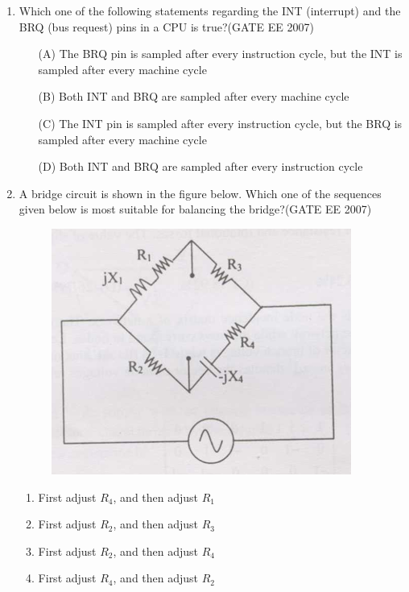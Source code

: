 \documentclass[a4paper,10pt]{exam}
\theoremstyle{remark}
\begin{document}
\begin{enumerate}
\vspace{1em}

\item 
Which one of the following statements regarding the INT (interrupt) and the BRQ (bus request) pins in a CPU is true?\hfill{(GATE EE 2007)}

\begin{enumerate}
    \item[(A)] The BRQ pin is sampled after every instruction cycle, but the INT is sampled after every machine cycle
    \item[(B)] Both INT and BRQ are sampled after every machine cycle
    \item[(C)] The INT pin is sampled after every instruction cycle, but the BRQ is sampled after every machine cycle
    \item[(D)] Both INT and BRQ are sampled after every instruction cycle
\end{enumerate}

\vspace{1em}

\item 
A bridge circuit is shown in the figure below. Which one of the sequences given below is most suitable for balancing the bridge?\hfill{(GATE EE 2007)}

\begin{figure}[H]
    \centering
    \includegraphics[width=0.5\linewidth]{figs/Q 70.png}
\end{figure}

\begin{multicols}{2}
\begin{enumerate}
 \item  First adjust $R_4$, and then adjust $R_1$
\item   First adjust $R_2$, and then adjust $R_3$
 \item   First adjust $R_2$, and then adjust $R_4$
 \item  First adjust $R_4$, and then adjust $R_2$
 \end{enumerate}
\end{multicols}


\end{enumerate}
\end{document}
